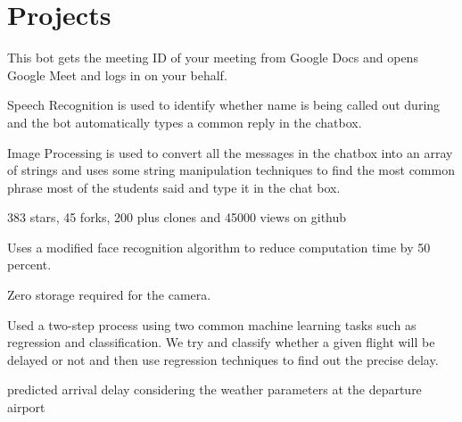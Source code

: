 \documentclass[]{deedy-resume-reversed}
\begin{document}
\begin{minipage}[t]{0.60\textwidth}
\section{Projects}
\begin{tightemize}
\item This bot gets the meeting ID of your meeting from Google Docs and opens Google Meet and logs in on your behalf.
\item Speech Recognition is used to identify whether name is being called out during  and the bot automatically types a common reply in the chatbox.
\item Image Processing is used to convert all the messages in the chatbox into an array of strings and uses some string manipulation techniques to find the most common phrase most of the students said and type it in the chat box.
\item 383 stars, 45 forks, 200 plus clones and 45000 views on github
\end{tightemize}
\sectionsep

\begin{tightemize}
\item  Uses a modified face recognition algorithm to reduce computation time by 50 percent.
\item  Zero storage required for the camera.

\end{tightemize}
\sectionsep


\begin{tightemize}
\item  Used a two-step process using two common machine learning tasks such as regression and classification. We try and classify whether a given flight will be delayed or not and then use regression techniques to find out the precise delay.
\item  predicted arrival delay considering the weather parameters at the departure airport

\end{tightemize}
\sectionsep



\end{minipage}
\end{document}
